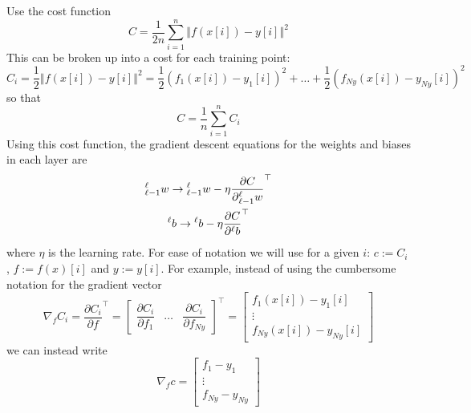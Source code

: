 \documentclass[11pt]{report} %
\begin{document}
Use the cost function
\begin{equation}
C=\dfrac{1}{2n}\sum_{i=1}^{n}\left\Vert f\left(x\left[i\right]\right)-y\left[i\right]\right\Vert ^{2}
\end{equation}
This can be broken up into a cost for each training point:
\begin{equation}
C_{i}=\dfrac{1}{2}\left\Vert f\left(x\left[i\right]\right)-y\left[i\right]\right\Vert ^{2}=\dfrac{1}{2}\left(f_{1}\left(x\left[i\right]\right)-y_{1}\left[i\right]\right)^{2}+\dots+\dfrac{1}{2}\left(f_{Ny}\left(x\left[i\right]\right)-y_{Ny}\left[i\right]\right)^{2}
\end{equation}
so that
\begin{equation}
C=\dfrac{1}{n}\sum_{i=1}^{n}C_{i}
\end{equation}
Using this cost function, the gradient descent equations for the weights and biases in each layer are
\begin{gather}
\mathstrut_{\ell-1}^{\ell}w\rightarrow\mathstrut_{\ell-1}^{\ell}w-\eta\dfrac{\partial C}{\partial\mathstrut_{\ell-1}^{\ell}w}^{\top} \\
\mathstrut^{\ell}b\rightarrow\mathstrut^{\ell}b-\eta\dfrac{\partial C}{\partial\mathstrut^{\ell}b}^{\top}
\end{gather}
where $\eta$ is the learning rate. For ease of notation we will use for a given $i$: $c := C_{i}$, $f := f\left(x\right)\left[i\right]$ and $y:= y\left[i\right]$. For example, instead of using the cumbersome notation for the gradient vector
\begin{equation}
\nabla_{f}C_{i}=\dfrac{\partial C_{i}}{\partial f}^{\top}=\begin{bmatrix}\dfrac{\partial C_{i}}{\partial f_{1}} & \dots & \dfrac{\partial C_{i}}{\partial f_{Ny}}\end{bmatrix}^{\top}=\begin{bmatrix}f_{1}\left(x\left[i\right]\right)-y_{1}\left[i\right]\\
\vdots\\
f_{Ny}\left(x\left[i\right]\right)-y_{Ny}\left[i\right]
\end{bmatrix}
\end{equation}
we can instead write
\begin{equation}
\nabla_{f}c=\begin{bmatrix}f_{1}-y_{1}\\
\vdots\\
f_{Ny}-y_{Ny}
\end{bmatrix}
\end{equation}
\end{document}
